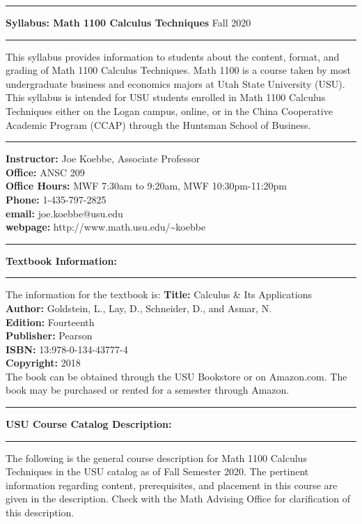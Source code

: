 \documentclass[10pt,fleqn]{article}
\begin{document}
%
%
\vskip0.1in\hrule\vskip0.1in \noindent
{\bf Syllabus: Math 1100 Calculus Techniques} \hfill Fall 2020
\vskip0.1in\hrule\vskip0.1in \noindent
This syllabus provides information to students about the content, format, and
grading of Math 1100 Calculus Techniques. Math 1100 is a course taken by most
undergraduate business and economics majors at Utah State University (USU). This
syllabus is intended for USU students enrolled in Math 1100 Calculus Techniques
either on the Logan campus, online, or in the China Cooperative Academic
Program (CCAP) through the Huntsman School of Business.
%
%
\vskip0.1in\hrule\vskip0.1in
\noindent
{\bf Instructor:} \hfill   Joe Koebbe, Associate Professor \\
\smallskip\noindent
{\bf Office:}     \hfill   ANSC 209 \\
\smallskip\noindent
{\bf Office Hours:}     \hfill   MWF 7:30am to 9:20am, MWF 10:30pm-11:20pm \\
\smallskip\noindent
{\bf Phone:}      \hfill   1-435-797-2825 \\
\smallskip\noindent
{\bf email:}      \hfill   joe.koebbe@usu.edu \\
\smallskip\noindent
{\bf webpage:}    \hfill   http://www.math.usu.edu/\~{}koebbe
\vskip0.1in\hrule\vskip0.1in \noindent
{\bf Textbook Information:}
\vskip0.1in\hrule\vskip0.1in
\noindent
The information for the textbook is:
\vskip0.1in\noindent
{\bf Title:} \hfill Calculus \& Its Applications \\
\smallskip\noindent
{\bf Author:} \hfill Goldstein, L., Lay, D., Schneider, D., and Asmar, N.\\
\smallskip\noindent
{\bf Edition:} \hfill Fourteenth \\
\smallskip\noindent
{\bf Publisher:} \hfill  Pearson \\
\smallskip\noindent
{\bf ISBN:} \hfill 13:978-0-134-43777-4 \\
\smallskip\noindent
{\bf Copyright:} \hfill 2018 \\
\smallskip\noindent
The book can be obtained through the USU Bookstore or on Amazon.com. The book
may be purchased or rented for a semester through Amazon.
\vskip0.1in\hrule\vskip0.1in \noindent
{\bf USU Course Catalog Description:}
\vskip0.1in\hrule\vskip0.1in
\noindent
The following is the general course description for Math 1100 Calculus
Techniques in the USU catalog as of Fall Semester 2020. The pertinent
information regarding content, prerequisites, and placement in this course are
given in the description. Check with the Math Advising Office for clarification
of this description.
\end{document}
